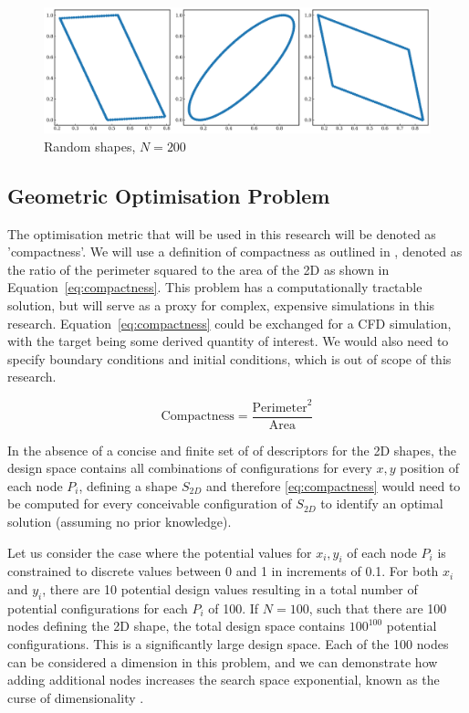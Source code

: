 \documentclass{article}
\begin{document}
\begin{figure}[htp]
    \centering
    \includegraphics[width=12cm]{figures/output.png}
    \caption{Random shapes, $N=200$}
    \label{fig:randomshapes}
\end{figure}


\subsection{Geometric Optimisation Problem}

The optimisation metric that will be used  in this research will be denoted as 'compactness'. We will use a definition of compactness as outlined in \cite{Bribiesca2008}, denoted as the ratio of the perimeter squared to the area of the 2D as shown in Equation~\eqref{eq:compactness}. This problem has a computationally tractable solution, but will serve as a proxy for complex, expensive simulations in this research. Equation~\eqref{eq:compactness} could be exchanged for a CFD simulation, with the target being some derived quantity of interest. We would also need to specify boundary conditions and initial conditions, which is out of scope of this research.

\begin{equation}
    \text{Compactness}=\frac{\text{Perimeter}^2}{\text{Area}}
    \label{eq:compactness}
\end{equation}

In the absence of a concise and finite set of of descriptors for the 2D shapes, the design space contains all combinations of configurations for every $x,y$ position of each node $P_i$, defining a shape $S_{2D}$ and therefore \eqref{eq:compactness} would need to be computed for every conceivable configuration of $S_{2D}$ to identify an optimal solution (assuming no prior knowledge). 

Let us consider the case where the potential values for $x_i,y_i$ of each node $P_i$ is constrained to discrete values between 0 and 1 in increments of 0.1. For both $x_i$ and $y_i$, there are 10 potential design values resulting in a total number of potential configurations for each $P_i$ of 100. If $N=100$, such that there are 100 nodes defining the 2D shape, the total design space contains $100^{100}$ potential configurations. This is a significantly large design space. Each of the 100 nodes can be considered a dimension in this problem, and we can demonstrate how adding additional nodes increases the search space exponential, known as the curse of dimensionality \citep{Keogh2017}.
\end{document}
